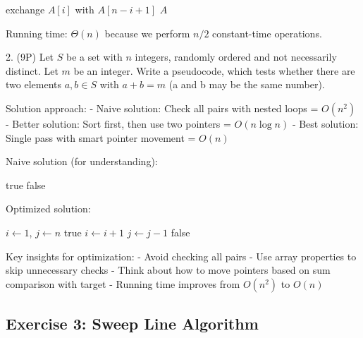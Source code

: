 \begin{algorithm}
\begin{algorithmic}[1]
    \State exchange $A[i]$ with $A[n-i+1]$
\EndFor
\State \Return $A$
\EndProcedure
\end{algorithmic}
\end{algorithm}

Running time: $\Theta(n)$ because we perform $n/2$ constant-time operations.

2. (9P) Let $S$ be a set with $n$ integers, randomly ordered and not necessarily distinct. Let $m$ be an integer. Write a pseudocode, which tests whether there are two elements $a,b \in S$ with $a + b = m$ (a and b may be the same number).

Solution approach:
- Naive solution: Check all pairs with nested loops = $O(n^2)$
- Better solution: Sort first, then use two pointers = $O(n \log n)$
- Best solution: Single pass with smart pointer movement = $O(n)$

Naive solution (for understanding):
\begin{algorithm}
\begin{algorithmic}[1]
            \State \Return true
        \EndIf
    \EndFor
\EndFor
\State \Return false
\EndProcedure
\end{algorithmic}
\end{algorithm}

Optimized solution:
\begin{algorithm}
\begin{algorithmic}[1]
\State $i \gets 1$, $j \gets n$
        \State \Return true
        \State $i \gets i+1$
    \Else
        \State $j \gets j-1$
    \EndIf
\EndWhile
\State \Return false
\EndProcedure
\end{algorithmic}
\end{algorithm}

Key insights for optimization:
- Avoid checking all pairs
- Use array properties to skip unnecessary checks
- Think about how to move pointers based on sum comparison with target
- Running time improves from $O(n^2)$ to $O(n)$

\subsection{Exercise 3: Sweep Line Algorithm}

